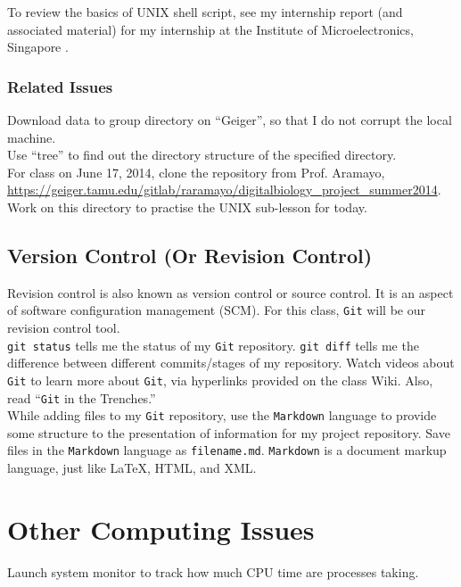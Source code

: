 To review the basics of UNIX shell script, see my internship report (and associated material) for my internship at the Institute of Microelectronics, Singapore \cite{Ong2004a}.

\subsubsection{Related Issues}
\label{sssec:ShellScriptingBasics:RelatedIssues}

Download data to group directory on ``Geiger'', so that I do not corrupt the local machine. \\

Use ``tree'' to find out the directory structure of the specified directory. \\

For class on June 17, 2014, clone the repository from Prof. Aramayo, \url{https://geiger.tamu.edu/gitlab/raramayo/digitalbiology_project_summer2014}. Work on this directory to practise the UNIX sub-lesson for today.






\subsection{Version Control (Or Revision Control)}
\label{ssec:ShellScriptingBasics}

Revision control is also known as version control or source control. It is an aspect of software configuration management (SCM). For this class, {\tt Git} \cite{Chacon2009,Swicegood2010,Humble2011,VibrantPublishers2012b,Fox2013} will be our revision control tool. \\

{\tt git status} tells me the status of my {\tt Git} repository. {\tt git diff} tells me the difference between different commits/stages of my repository. Watch videos about {\tt Git} to learn more about {\tt Git}, via hyperlinks provided on the class Wiki. Also, read ``{\tt Git} in the Trenches.'' \\

While adding files to my {\tt Git} repository, use the {\tt Markdown} language to provide some structure to the presentation of information for my project repository. Save files in the {\tt Markdown} language as {\tt filename.md}. {\tt Markdown} is a document markup language, just like \LaTeX, HTML, and XML. \\

\section{Other Computing Issues}
\label{sec:OtherComputingIssues}




Launch system monitor to track how much CPU time are processes taking. 





















